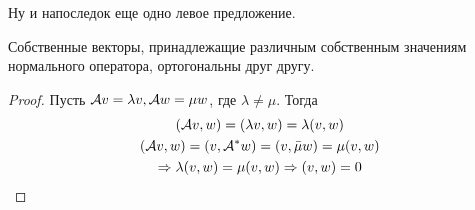 Ну и напоследок еще одно левое предложение.

\begin{theorem-non}
    Собственные векторы, принадлежащие различным собственным значениям нормального оператора, ортогональны друг другу.
\end{theorem-non}
\begin{proof}
    Пусть $\mathcal{A} v = \lambda v, \mathcal{A} w = \mu w$, где $\lambda \neq \mu$. Тогда \begin{gather*}
        (\mathcal{A} v, w) = (\lambda v, w) = \lambda (v, w) \\
        (\mathcal{A} v, w) = (v, \mathcal{A}^* w) = (v, \bar{\mu} w) = \mu (v, w) \\
        \Rightarrow \lambda (v, w) = \mu (v, w) \Rightarrow (v, w) = 0
    \end{gather*}
\end{proof}